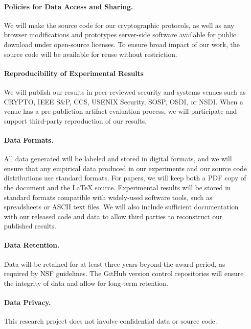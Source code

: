 \paragraph{Policies for Data Access and Sharing.}
We will make the source code for our cryptographic protocols, as well as any
browser modifications and prototypes server-side software available for public
download under open-source licenses.
%
To ensure broad impact of our work, the source code will be available for reuse
without restriction.
%

\paragraph{Reproducibility of Experimental Results}
%
We will publish our results in peer-reviewed security and systems venues such as
CRYPTO, IEEE S\&P, CCS, USENIX Security, SOSP, OSDI, or NSDI.
%
When a venue has a pre-publiction artifact evaluation process, we will
participate and support third-party reproduction of our results.
%

\paragraph{Data Formats.}
All data generated will be labeled and stored in digital formats, and we will
ensure that any empirical data produced in our experiments and our source code
distributions use standard formats.
%
For papers, we will keep both a PDF copy of the document and the {\LaTeX}
source.
%
Experimental results will be stored in standard formats compatible with
widely-used software tools, such as spreadsheets or ASCII text files.
%
We will also include sufficient documentation with our released code and data
to allow third parties to reconstruct our published results.
%

\paragraph{Data Retention.}
Data will be retained for at least three years beyond the award period, as
required by NSF guidelines.
%
The GitHub version control repositories will ensure the integrity of data and
allow for long-term retention.
%

\paragraph{Data Privacy.}
This research project does not involve confidential data or source code.
